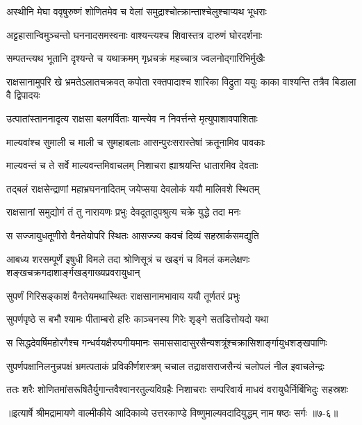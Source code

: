 \twolineshloka
{अस्थीनि मेघा ववृषुरुष्णं शोणितमेव च}
{वेलां समुद्राश्चोत्क्रान्ताश्चेलुश्चाप्यथ भूधराः} %

\twolineshloka
{अट्टहासान्विमुञ्चन्तो घननादसमस्वनाः}
{वाश्यन्त्यश्च शिवास्तत्र दारुणं घोरदर्शनाः} %

\twolineshloka
{सम्पतन्त्यथ भूतानि दृश्यन्ते च यथाक्रमम्}
{गृध्रचक्रं महच्चात्र ज्वलनोद्गारिभिर्मुखैः} %

\twolineshloka
{राक्षसानामुपरि खे भ्रमतेऽलातचक्रवत्}
{कपोता रक्तपादाश्च शारिका विद्रुता ययुः काका वाश्यन्ति तत्रैव बिडाला वै द्विपादयः} %

\twolineshloka
{उत्पातांस्ताननादृत्य राक्षसा बलगर्विताः}
{यान्त्येव न निवर्त्तन्ते मृत्युपाशावपाशिताः} %

\twolineshloka
{माल्यवांश्च सुमाली च माली च सुमहाबलाः}
{आसन्पुरःसरास्तेषां क्रतूनामिव पावकाः} %

\twolineshloka
{माल्यवन्तं च ते सर्वे माल्यवन्तमिवाचलम्}
{निशाचरा ह्याश्रयन्ति धातारमिव देवताः} %

\twolineshloka
{तद्बलं राक्षसेन्द्राणां महाभ्रघननादितम्}
{जयेप्सया देवलोकं ययौ मालिवशे स्थितम्} %

\twolineshloka
{राक्षसानां समुद्योगं तं तु नारायणः प्रभुः}
{देवदूतादुपश्रुत्य चक्रे युद्धे तदा मनः} %

\twolineshloka
{स सज्जायुधतूणीरो वैनतेयोपरि स्थितः}
{आसज्ज्य कवचं दिव्यं सहस्रार्कसमद्युति} %

\twolineshloka
{आबध्य शरसम्पूर्णे इषुधी विमले तदा}
{श्रोणिसूत्रं च खड्गं च विमलं कमलेक्षणः शङ्खचक्रगदाशार्ङ्गखड्गाख्यप्रवरायुधान्} %

\twolineshloka
{सुपर्णं गिरिसङ्काशं वैनतेयमथास्थितः}
{राक्षसानामभावाय ययौ तूर्णतरं प्रभुः} %

\twolineshloka
{सुपर्णपृष्ठे स बभौ श्यामः पीताम्बरो हरिः}
{काञ्चनस्य गिरेः शृङ्गे सतडित्तोयदो यथा} %

\twolineshloka
{स सिद्धदेवर्षिमहोरगैश्च गन्धर्वयक्षैरुपगीयमानः}
{समाससादासुरसैन्यशत्रूंश्चक्रासिशार्ङ्गायुधशङ्खपाणिः} %

\twolineshloka
{सुपर्णपक्षानिलनुन्नपक्षं भ्रमत्पताकं प्रविकीर्णशस्त्रम्}
{चचाल तद्राक्षसराजसैन्यं चलोपलं नील इवाचलेन्द्रः} %

\twolineshloka
{ततः शरैः शोणितमांसरूषितैर्युगान्तवैश्वानरतुल्यविग्रहैः}
{निशाचराः सम्परिवार्य माधवं वरायुधैर्निर्बिभिदुः सहस्रशः} %


॥इत्यार्षे श्रीमद्रामायणे वाल्मीकीये आदिकाव्ये उत्तरकाण्डे विष्णुमाल्यवदादियुद्धम् नाम षष्ठः सर्गः ॥७-६॥
